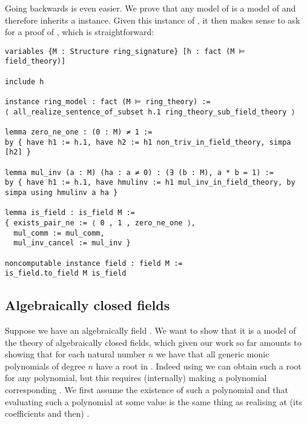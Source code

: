 Going backwards is even easier.
We prove that any model of 
is a model of  and therefore inherits a  instance.
Given this instance of ,
it then makes sense to ask for a proof of ,
which is straightforward:

\begin{lstlisting}
variables {M : Structure ring_signature} [h : fact (M ⊨ field_theory)]

include h

instance ring_model : fact (M ⊨ ring_theory) :=
⟨ all_realize_sentence_of_subset h.1 ring_theory_sub_field_theory ⟩

lemma zero_ne_one : (0 : M) ≠ 1 :=
by { have h1 := h.1, have h2 := h1 non_triv_in_field_theory, simpa [h2] }

lemma mul_inv (a : M) (ha : a ≠ 0) : (∃ (b : M), a * b = 1) :=
by { have h1 := h.1, have hmulinv := h1 mul_inv_in_field_theory, by simpa using hmulinv a ha }

lemma is_field : is_field M :=
{ exists_pair_ne := ⟨ 0 , 1 , zero_ne_one ⟩,
  mul_comm := mul_comm,
  mul_inv_cancel := mul_inv }

noncomputable instance field : field M :=
is_field.to_field M is_field \end{lstlisting}

\subsection{Algebraically closed fields}

Suppose we have an algebraically field .
We want to show that it is a model of the theory of algebraically closed fields,
which given our work so far amounts to showing that for each natural number $n$
we have that all generic monic polynomials of degree $n$ have a root in .
Indeed using  we can obtain such a root for any polynomial,
but this requires (internally) making a polynomial corresponding .
We first assume the existence of such a polynomial 
and that evaluating such a polynomial
at some value  is the same thing as realising 
at (its coefficients and then) .

